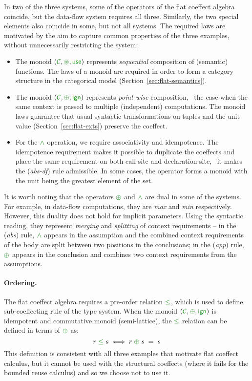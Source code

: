 \noindent
In two of the three systems, some of the operators of the flat coeffect algebra coincide,
but the data-flow system requires all three. Similarly, the two special elements also 
coincide in some, but not all systems. The required laws are motivated by the aim to capture
common properties of the three examples, without unnecessarily restricting the system:

\begin{itemize}
\item The monoid $(\C, \cseq, \cunit)$ represents \emph{sequential} composition of (semantic)
functions. The laws of a monoid are required in order to form a category structure in the 
categorical model (Section~\ref{sec:flat-semantics}).

\item The monoid $(\C, \cpar, \czero)$ represents \emph{point-wise} composition, \ie~the case when the
same context is passed to multiple (independent) computations. The monoid laws guarantee 
that usual syntactic transformations on tuples and the unit value (Section~\ref{sec:flat-exts})
preserve the coeffect. 

\item For the $\czip$ operation, we require associativity and idempotence. The idempotence
requirement makes it possible to duplicate the coeffects and place the same requirement on both
call-site and declaration-site, \ie~it makes the (\emph{abs-df}) rule admissible. In some cases, 
the operator forms a monoid with the unit being the greatest element of the set. 
\end{itemize}

It is worth noting that the operators $\cpar$ and $\czip$ are dual in some of the systems. For 
example, in data-flow computations, they are \emph{max} and \emph{min} respectively. However, this
duality does not hold for implicit parameters. Using the syntactic reading, they represent 
\emph{merging} and \emph{splitting} of context requirements -- in the (\emph{abs}) rule, 
$\czip$ appears in the assumption and the combined context requirements of the body are split 
between two positions in the conclusions; in the (\emph{app}) rule, $\cpar$ appears in the 
conclusion and combines two context requirements from the assumptions.

\paragraph{Ordering.}

The flat coeffect algebra requires a pre-order relation $\cleq$, which is used to define 
sub-coeffecting rule of the type system. When the monoid $(\C, \cpar, \czero)$ is idempotent
and commutative monoid (semi-lattice), the $\cleq$ relation can be defined in terms of $\cpar$ as:
%
\begin{equation*}
r \;\cleq\; s \;\Longleftrightarrow\; r \;\cpar\; s \;=\; s
\end{equation*}
%
This definition is consistent with all three examples that motivate flat coeffect calculus, but
it cannot be used with the structural coeffects (where it fails for the bounded reuse 
calculus) and so we choose not to use it.

